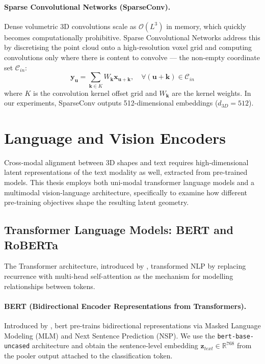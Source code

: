 \paragraph{Sparse Convolutional Networks (SparseConv).} Dense volumetric 3D convolutions scale as $\mathcal{O}(L^3)$ in memory, which quickly becomes computationally prohibitive. Sparse Convolutional Networks \cite{graham20183d, choy20194d} address this by discretising the point cloud onto a high-resolution voxel grid and computing convolutions only where there is content to convolve --- the non-empty coordinate set $\mathcal{C}_{in}$:
\begin{equation}
    \mathbf{y}_{\mathbf{u}} = \sum_{\mathbf{k} \in K} W_{\mathbf{k}} \mathbf{x}_{\mathbf{u} + \mathbf{k}}, \quad \forall (\mathbf{u} + \mathbf{k}) \in \mathcal{C}_{in}
\end{equation}
where $K$ is the convolution kernel offset grid and $W_{\mathbf{k}}$ are the kernel weights. In our experiments, SparseConv outputs 512-dimensional embeddings ($d_{3D} = 512$).


\section{Language and Vision Encoders}
\label{sec:encoders_background}

Cross-modal alignment between 3D shapes and text requires high-dimensional latent representations of the text modality as well, extracted from pre-trained models. This thesis employs both uni-modal transformer language models and a multimodal vision-language architecture, specifically to examine how different pre-training objectives shape the resulting latent geometry.

\subsection{Transformer Language Models: BERT and RoBERTa}
\label{subsec:text_encoders}

The Transformer architecture, introduced by \textcite{vaswani2017attention}, transformed NLP by replacing recurrence with multi-head self-attention as the mechanism for modelling relationships between tokens.

\paragraph{BERT (Bidirectional Encoder Representations from Transformers).}
Introduced by \textcite{devlin2019bert}, \gls{bert} pre-trains bidirectional representations via Masked Language Modeling (MLM) and Next Sentence Prediction (NSP). We use the \texttt{bert-base-uncased} architecture and obtain the sentence-level embedding $\mathbf{z}_{text} \in \mathbb{R}^{768}$ from the pooler output attached to the classification token.

